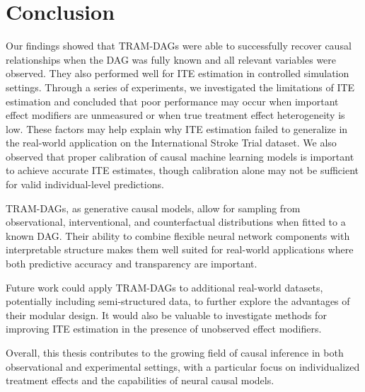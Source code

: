 \section{Conclusion}


Our findings showed that TRAM-DAGs were able to successfully recover causal relationships when the DAG was fully known and all relevant variables were observed. They also performed well for ITE estimation in controlled simulation settings. Through a series of experiments, we investigated the limitations of ITE estimation and concluded that poor performance may occur when important effect modifiers are unmeasured or when true treatment effect heterogeneity is low. These factors may help explain why ITE estimation failed to generalize in the real-world application on the International Stroke Trial dataset. We also observed that proper calibration of causal machine learning models is important to achieve accurate ITE estimates, though calibration alone may not be sufficient for valid individual-level predictions.

TRAM-DAGs, as generative causal models, allow for sampling from observational, interventional, and counterfactual distributions when fitted to a known DAG. Their ability to combine flexible neural network components with interpretable structure makes them well suited for real-world applications where both predictive accuracy and transparency are important.

Future work could apply TRAM-DAGs to additional real-world datasets, potentially including semi-structured data, to further explore the advantages of their modular design. It would also be valuable to investigate methods for improving ITE estimation in the presence of unobserved effect modifiers.

Overall, this thesis contributes to the growing field of causal inference in both observational and experimental settings, with a particular focus on individualized treatment effects and the capabilities of neural causal models.

